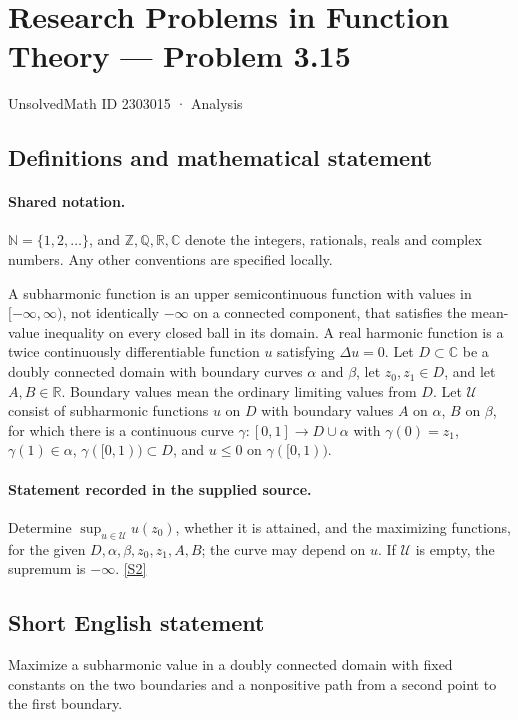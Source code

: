 \documentclass[11pt]{article}
\newcommand{\sref}[2]{\hyperlink{source:#1:#2}{[S#2]}}
\begin{document}
\setcounter{section}{2303014}
\section{Research Problems in Function Theory — Problem 3.15}\label{2303015}
{\small\sffamily UnsolvedMath ID 2303015 · Analysis}
\subsection{Definitions and mathematical statement}

\paragraph{Shared notation.}$\mathbb N=\{1,2,\ldots\}$, and $\mathbb Z,\mathbb Q,\mathbb R,\mathbb C$ denote the integers, rationals, reals and complex numbers. Any other conventions are specified locally.


A subharmonic function is an upper semicontinuous function with values in $[-\infty,\infty)$, not identically $-\infty$ on a connected component, that satisfies the mean-value inequality on every closed ball in its domain. A real harmonic function is a twice continuously differentiable function $u$ satisfying $\Delta u=0$. Let $D\subset\mathbb C$ be a doubly connected domain with boundary curves $\alpha$ and $\beta$, let $z_0,z_1\in D$, and let $A,B\in\mathbb R$. Boundary values mean the ordinary limiting values from $D$. Let $\mathcal U$ consist of subharmonic functions $u$ on $D$ with boundary values $A$ on $\alpha$, $B$ on $\beta$, for which there is a continuous curve $\gamma:[0,1]\to D\cup\alpha$ with $\gamma(0)=z_1$, $\gamma(1)\in\alpha$, $\gamma([0,1))\subset D$, and $u\leq0$ on $\gamma([0,1))$.
\paragraph{Statement recorded in the supplied source.}
Determine $\sup_{u\in\mathcal U}u(z_0)$, whether it is attained, and the maximizing functions, for the given $D,\alpha,\beta,z_0,z_1,A,B$; the curve may depend on $u$. If $\mathcal U$ is empty, the supremum is $-\infty$. \sref{2303015}{2}
\subsection{Short English statement}
Maximize a subharmonic value in a doubly connected domain with fixed constants on the two boundaries and a nonpositive path from a second point to the first boundary.
\end{document}

